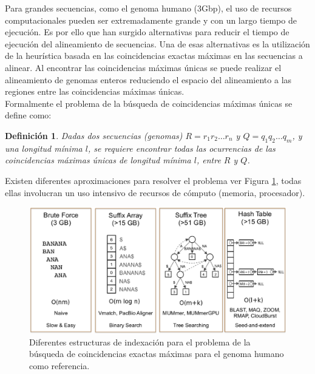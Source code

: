 \documentclass[12pt,a4paper]{article}
\newtheorem{mydef}{Definición}
\begin{document}
\indent
Para grandes secuencias, como el genoma humano (3Gbp), el uso de recursos computacionales pueden ser extremadamente grande y con un largo tiempo de ejecución. Es por ello que han surgido alternativas para reducir el tiempo de ejecución del alineamiento de secuencias. Una de esas alternativas es la utilización de la heurística basada en las coincidencias exactas máximas en las secuencias a alinear. Al encontrar las coincidencias máximas  únicas se puede realizar el alineamiento de genomas enteros reduciendo el espacio del alineamiento a las regiones entre las coincidencias máximas únicas.\\
\indent
Formalmente el problema de la búsqueda de coincidencias máximas únicas se define como:
\begin{mydef}
  Dadas dos secuencias (genomas) $R=r_{1}r_{2}\hdots r_{n}$ y $Q=q_{1}q_{2}\hdots q_{m}$, y una longitud mínima $l$, se requiere encontrar todas las ocurrencias de las coincidencias máximas únicas de longitud mínima $l$, entre $R$ y $Q$.
\end{mydef}
Existen diferentes aproximaciones para resolver el problema ver Figura \ref{fig:state}, todas ellas involucran un uso intensivo de recursos de cómputo (memoria, procesador).
\begin{figure}[h] 
   \centering 
   \includegraphics[scale=0.3]{state.eps} 
   \caption{Diferentes estructuras de indexación para el problema de la búsqueda de coincidencias exactas máximas para el genoma humano como referencia.} 
   \label{fig:state} 
 \end{figure}
\indent
\end{document}

